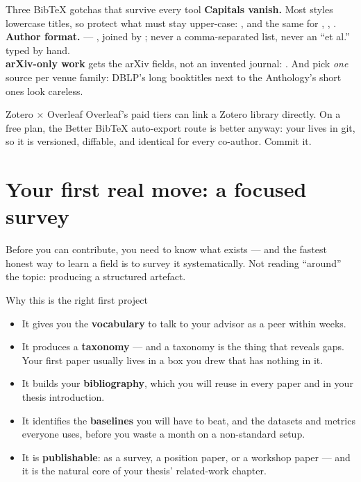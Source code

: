 \documentclass[11pt,a4paper]{article}
\begin{document}
\begin{wbox}{Three BibTeX gotchas that survive every tool}
\textbf{Capitals vanish.} Most styles lowercase titles, so protect what must
stay upper-case: , and the
same for , , .\\[3pt]
\textbf{Author format.} 
--- , joined by ; never a comma-separated list,
never an ``et al.'' typed by hand.\\[3pt]
\textbf{arXiv-only work} gets the arXiv fields, not an invented journal:
. And pick \emph{one} source per venue family:
DBLP's long booktitles next to the Anthology's short ones look careless.
\end{wbox}

\begin{cbox}{Zotero $\times$ Overleaf}
Overleaf's paid tiers can link a Zotero library directly. On a free plan, the
Better BibTeX auto-export route is better anyway: your  lives in
git, so it is versioned, diffable, and identical for every co-author. Commit it.
\end{cbox}

\section{Your first real move: a focused survey}
\label{sec:survey}

Before you can contribute, you need to know what exists --- and the fastest
honest way to learn a field is to survey it systematically. Not reading
``around'' the topic: producing a structured artefact.

\begin{cbox}{Why this is the right first project}
\begin{itemize}
  \item It gives you the \textbf{vocabulary} to talk to your advisor as a peer
        within weeks.
  \item It produces a \textbf{taxonomy} --- and a taxonomy is the thing that
        reveals gaps. Your first paper usually lives in a box you drew that
        has nothing in it.
  \item It builds your \textbf{bibliography}, which you will reuse in every
        paper and in your thesis introduction.
  \item It identifies the \textbf{baselines} you will have to beat, and the
        datasets and metrics everyone uses, before you waste a month on a
        non-standard setup.
  \item It is \textbf{publishable}: as a survey, a position paper, or a
        workshop paper --- and it is the natural core of your thesis'
        related-work chapter.
\end{itemize}
\end{cbox}
\end{document}
